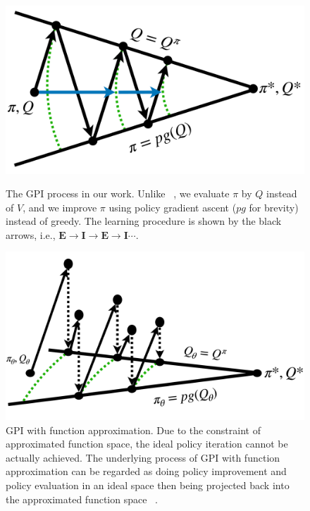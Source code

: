 \begin{figure}[t]
\centering 
\vspace{-0.5cm}
\begin{minipage}[t]{0.38\linewidth}
\centering
\includegraphics[width=0.95\linewidth]{body/figures/GPI.pdf}
\caption{ \small 
The GPI process in our work. 
Unlike ~\citep{sutton}, we evaluate $\pi$ by $Q$ instead of $V$, and we improve $\pi$ using policy gradient ascent ($pg$ for brevity) instead of greedy. The learning procedure is shown by the black arrows, i.e., $\textbf{E}\rightarrow\textbf{I} \rightarrow \textbf{E} \rightarrow \textbf{I} \cdots$. 
} 
\label{fig:gpi}
\vskip -0.2in
\end{minipage}
\hfill
\begin{minipage}[t]{0.58\linewidth}
\centering
\includegraphics[width=0.65\linewidth]{body/figures/GPI2.pdf}
\caption{\small 
GPI with function approximation. 
Due to the constraint of approximated function space, the ideal policy iteration cannot be actually achieved. The underlying process of GPI with function approximation can be regarded as doing policy improvement and policy evaluation in an ideal space then being projected back into the approximated function space ~\citep{sutton, op_reinforce}.
}
\end{minipage}
\end{figure}
